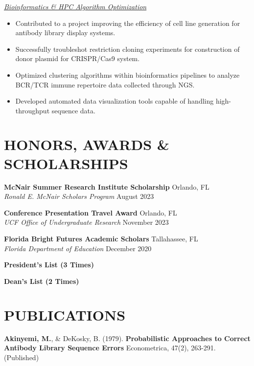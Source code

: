 \documentclass[a4paper,9pt]{extarticle}
\begin{document}
\vspace{2mm}
\noindent\textit{\underline{Bioinformatics \& HPC Algorithm Optimization }}
\vspace{2mm}
\begin{itemize}
    \item Contributed to a project improving the efficiency of cell line generation for antibody library display systems.
    \item Successfully troubleshot restriction cloning experiments for construction of donor plasmid for CRISPR/Cas9 system.
    \item Optimized clustering algorithms within bioinformatics pipelines to analyze BCR/TCR immune repertoire data collected through NGS.
    \item Developed automated data visualization tools capable of handling high-throughput sequence data.
\end{itemize}


\section*{HONORS, AWARDS \& SCHOLARSHIPS}

\noindent\textbf{McNair Summer Research Institute Scholarship}  \hfill Orlando, FL\\ 
\textit{Ronald E. McNair Scholars Program} \hfill {August 2023} \medskip

\noindent\textbf{Conference Presentation Travel Award}  \hfill Orlando, FL\\ 
\textit{UCF Office of Undergraduate Research} \hfill {November 2023} \medskip

\noindent\textbf{Florida Bright Futures Academic Scholars}  \hfill Tallahassee, FL\\
\textit{Florida Department of Education} \hfill {December 2020} \medskip

\noindent\textbf{President's List (3 Times)} \medskip

\noindent\textbf{Dean's List (2 Times)}




\section*{PUBLICATIONS}

\noindent \textbf{Akinyemi, M.}, \& DeKosky, B. (1979). \textbf{Probabilistic Approaches to Correct Antibody Library Sequence Errors} Econometrica, 47(2), 263-291. (Published)
\end{document}

